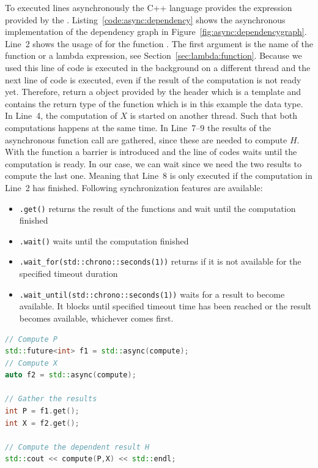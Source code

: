\documentclass[11pt,fleqn]{book} %
\begin{document}
To executed lines asynchronously the C++ language provides the  expression provided by the . Listing~\ref{code:async:dependency} shows the asynchronous implementation of the dependency graph in Figure~\ref{fig:async:dependencygraph}. Line~2 shows the usage of  for the function . The first argument is the name of the function or a lambda expression, see Section~\ref{sec:lambda:function}. Because we used  this line of code is executed in the background on a different thread and the next line of code is executed, even if the result of the computation is not ready yet. Therefore,  return a  object provided by the  header which is a template and contains the return type of the function which is in this example the  data type. In Line~4, the computation of $X$ is started on another thread. Such that both computations happens at the same time. In Line~7--9 the results of the asynchronous function call are gathered, since these are needed to compute $H$. With the  function a barrier is introduced and the line of codes waits until the computation is ready. In our case, we can wait since we need the two results to compute the last one. Meaning that Line~8 is only executed if the computation in Line~2 has finished. Following synchronization features are available:
\begin{itemize}
\item \lstinline|.get()| returns the result of the functions and wait until the computation finished
\item \lstinline|.wait()| waits until the computation finished
\item \lstinline|.wait_for(std::chrono::seconds(1))| returns if it is not available for the specified timeout duration 
\item \lstinline|.wait_until(std::chrono::seconds(1))| waits for a result to become available. It blocks until specified timeout time has been reached or the result becomes available, whichever comes first. 
\end{itemize}

\begin{lstlisting}[language=c++,caption={Asynchronous execution of the dependency graph.\label{code:async:dependency}},float,floatplacement=tb]
// Compute P
std::future<int> f1 = std::async(compute);
// Compute X
auto f2 = std::async(compute);

// Gather the results
int P = f1.get();
int X = f2.get();

// Compute the dependent result H
std::cout << compute(P,X) << std::endl;
\end{lstlisting}
\end{document}
